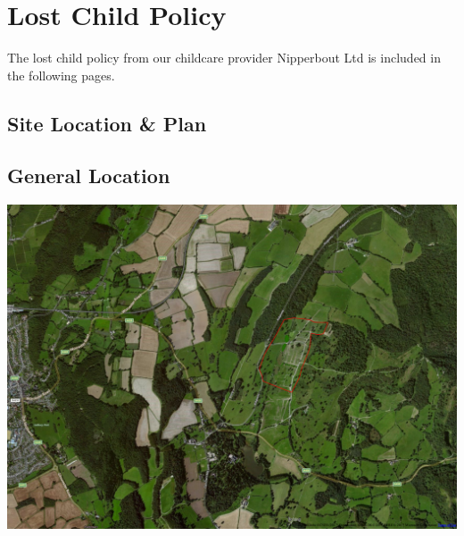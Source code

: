 \section{Lost Child Policy}
\label{lost-child-policy}
The lost child policy from our childcare provider Nipperbout Ltd is included in the following pages.

\newpage

\begin{landscape}
\thispagestyle{empty}
\section{Site Location \& Plan}
\label{site-plan}
\subsection{General Location}
\includegraphics[width=23cm]{./supplementary/wide-map.png}
\end{landscape}

